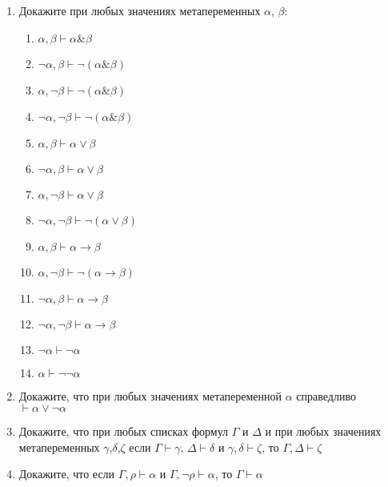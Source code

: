 \documentclass[10pt,a4paper,oneside]{article}
\begin{document}
\begin{enumerate}
\item Докажите при любых значениях метапеременных $\alpha$, $\beta$:
\begin{enumerate}
\item $\alpha,\beta \vdash \alpha\&\beta$
\item $\neg\alpha,\beta \vdash \neg(\alpha\&\beta)$
\item $\alpha,\neg\beta \vdash \neg(\alpha\&\beta)$
\item $\neg\alpha,\neg\beta \vdash \neg(\alpha\&\beta)$
\item $\alpha,\beta \vdash \alpha\vee\beta$
\item $\neg\alpha,\beta \vdash \alpha\vee\beta$
\item $\alpha,\neg\beta \vdash \alpha\vee\beta$
\item $\neg\alpha,\neg\beta \vdash \neg(\alpha\vee\beta)$
\item $\alpha,\beta \vdash \alpha\rightarrow\beta$
\item $\alpha,\neg\beta \vdash \neg(\alpha\rightarrow\beta)$
\item $\neg\alpha,\beta \vdash \alpha\rightarrow\beta$
\item $\neg\alpha,\neg\beta \vdash \alpha\rightarrow\beta$
\item $\neg\alpha \vdash \neg\alpha$
\item $\alpha \vdash \neg\neg\alpha$
\end{enumerate}

\item Докажите, что при любых значениях метапеременной $\alpha$ 
справедливо $\vdash \alpha\vee\neg\alpha$

\item Докажите, что при любых списках формул $\Gamma$ и $\Delta$ и при любых
значениях метапеременных $\gamma$,$\delta$,$\zeta$
если $\Gamma \vdash \gamma$, $\Delta \vdash \delta$ и $\gamma,\delta\vdash\zeta$,
то $\Gamma,\Delta\vdash\zeta$

\item Докажите, что если $\Gamma, \rho \vdash \alpha$ и $\Gamma, \neg\rho \vdash \alpha$,
то $\Gamma \vdash \alpha$
\end{enumerate}
\end{document}
